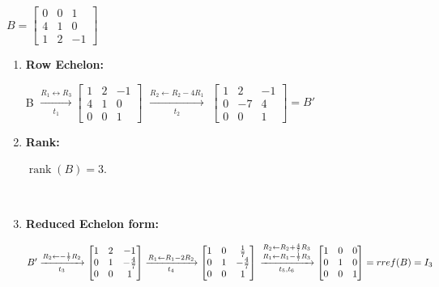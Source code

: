 $B=
\begin{bmatrix}
    0 & 0 & 1 \\
    4 & 1 & 0 \\
    1 & 2 & -1
\end{bmatrix}
$ \\[1.0em]

\begin{enumerate}
\item
    \textbf{Row Echelon:} \\[1.0em]
    \begin{answer}
        B $\xrightarrow[t_1]{R_1 \leftrightarrow R_3}
        \begin{bmatrix}
            1 & 2 & -1 \\
            4 & 1 & 0 \\
            0 & 0 & 1
        \end{bmatrix}
        $
        $\xrightarrow[t_2]{R_2 \leftarrow R_2 - 4R_1}$
        $\begin{bmatrix}
            1 & 2  & -1 \\
            0 & -7 & 4  \\
            0 & 0  & 1
        \end{bmatrix} = B'
        $\\[1.0em]
    \end{answer}

\item
    \textbf{Rank:}
    \begin{answer}
        $
        \operatorname{rank}(B)=3.
        $
    \end{answer} \\

\item 
    \textbf{Reduced Echelon form:} \\[1.0em]

    \begin{answer}
        $B' \xrightarrow[t_3]{R_2 \leftarrow -\frac{1}{7}R_2}
        \begin{bmatrix}
            1 & 2  & -1 \\
            0 &  1 & -\frac{4}{7}  \\
            0 & 0  & 1
        \end{bmatrix}
        \xrightarrow[t_4]{R_1 \leftarrow R_1 - 2R_2}
        \begin{bmatrix}
            1 & 0  & \frac{1}{7}  \\
            0 &  1 & -\frac{4}{7}  \\
            0 & 0  & 1
        \end{bmatrix} \\
        \xrightarrow[t_5, t_6]{
            \substack{
                R_2 \leftarrow R_2 + \frac{4}{7}R_3 \\
                R_1 \leftarrow R_1 - \frac{1}{7}R_3
            }
        }
        \begin{bmatrix}
            1 & 0 & 0  \\
            0 & 1 & 0  \\
            0 & 0 & 1
        \end{bmatrix} = rref(B) = I_3
        $
    \end{answer}

\end{enumerate}